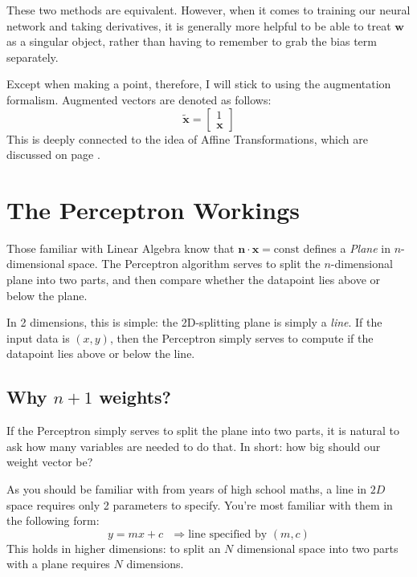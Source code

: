\documentclass[a4paper,openany,11pt]{book}
\renewcommand\vec[1]{\boldsymbol{\mathbf{#1}}}
\begin{document}
\begin{aside}
					These two methods are equivalent. However, when it comes to training our neural network and taking derivatives, it is generally more helpful to be able to treat $\vec{w}$ as a singular object, rather than having to remember to grab the bias term separately.

					Except when making a point, therefore, I will stick to using the augmentation formalism. Augmented vectors are denoted as follows:
					\begin{equation}
						\tilde{\vec{x}} = \begin{bmatrix}
							1 \\ \vec{x}
						\end{bmatrix}
					\end{equation}
					This is deeply connected to the idea of Affine Transformations, which are discussed on page \pageref{S:Affine}.

			\end{aside}

			\section{The Perceptron Workings}

				Those familiar with Linear Algebra know that $\vec{n} \cdot \vec{x} = \text{const}$ defines a \textit{Plane} in $n$-dimensional space. The Perceptron algorithm serves to split the $n$-dimensional plane into two parts, and then compare whether the datapoint lies above or below the plane. 

				In 2 dimensions, this is simple: the 2D-splitting plane is simply a \textit{line}. If the input data is $(x,y)$, then the Perceptron simply serves to compute if the datapoint lies above or below the line. 

				\subsection{Why $n+1$ weights?}

					If the Perceptron simply serves to split the plane into two parts, it is natural to ask how many variables are needed to do that. In short: how big should our weight vector be?

					As you should be familiar with from years of high school maths, a line in $2D$ space requires only 2 parameters to specify. You're most familiar with them in the following form:
					\begin{equation}
						y = mx + c ~~~\Longrightarrow \text{line specified by } (m,c)
					\end{equation}
					This holds in higher dimensions: to split an $N$ dimensional space into two parts with a plane requires $N$ dimensions. 
\end{document}
